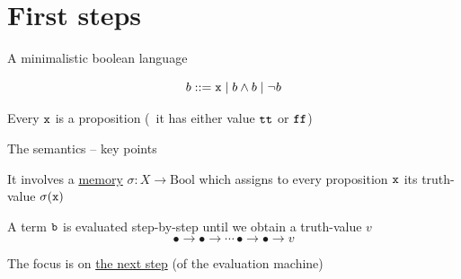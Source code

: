 \documentclass{beamer}
\begin{document}
\section{First steps}

\begin{frame}{A minimalistic boolean language}

        \begin{block}{\vspace*{-3.5ex}}
        \[
                b ::= \mathtt{x} \mid b \wedge b \mid \neg b
        \]
        \end{block} 

        \bigskip
        \centering
        Every $\mathtt{x}$ is a proposition (\ie\ it has either value
        $\mathtt{tt}$ or $\mathtt{ff}$)

        \pause
        \vfill
        \centering
\end{frame}

\begin{frame}{The semantics -- key points}

        It involves a \alert{\underline{memory}} $\sigma : X \to
        \mathrm{Bool}$
        which assigns to every proposition $\mathtt{x}$ its truth-value
        $\sigma(\mathtt{x})$

        \bigskip
        A term $\mathtt{b}$ is evaluated step-by-step 
        until we obtain a truth-value $v$ 
        \[
                \bullet \longrightarrow \bullet \longrightarrow \cdots  \,
                \bullet \longrightarrow \bullet \longrightarrow v
        \]
        

        The focus is on \alert{\underline{the next step}} (of the evaluation machine)
\end{frame}
\end{document}

